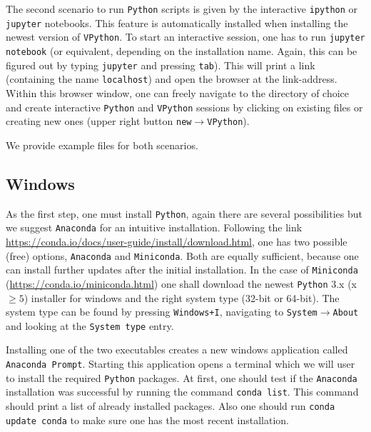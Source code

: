 \documentclass[12pt, UK english]{iopart}
\newcommand{\python}[0]{\texttt{Python}}
\newcommand{\vpython}[0]{\texttt{VPython}}
\newcommand{\code}[1]{{\scriptsize\colorbox{light-gray}{\texttt{#1}}}}
\begin{document}
The second scenario to run \python{} scripts is given by the interactive \texttt{ipython} or \texttt{jupyter} notebooks.
This feature is automatically installed when installing the newest version of \vpython{}.
To start an interactive session, one has to run \code{jupyter notebook} (or equivalent, depending on the installation name. Again, this can be figured out by typing \code{jupyter} and pressing \texttt{tab}).
This will print a link (containing the name \texttt{localhost}) and open the browser at the link-address.
Within this browser window, one can freely navigate to the directory of choice and create interactive \python{} and \vpython{} sessions by clicking on existing files or creating new ones (upper right button \texttt{new}$\rightarrow$\vpython{}).

We provide example files for both scenarios.

\subsection{Windows}\label{appendix:python-windows}

As the first step, one must install \python{}, again there are several possibilities but we suggest \texttt{Anaconda} for an intuitive installation.
Following the link \url{https://conda.io/docs/user-guide/install/download.html}, one has two possible (free) options, \texttt{Anaconda} and \texttt{Miniconda}.
Both are equally sufficient, because one can install further updates after the initial installation.
In the case of \texttt{Miniconda} (\url{https://conda.io/miniconda.html}) one shall download the newest \python{} 3.x (x $\geq5$) installer for windows and the right system type (32-bit or 64-bit).
The system type can be found by pressing \texttt{Windows+I}, navigating to \texttt{System}$\rightarrow$\texttt{About} and looking at the \texttt{System type} entry.

Installing one of the two executables creates a new windows application called \texttt{Anaconda Prompt}.
Starting this application opens a terminal which we will user to install the required \python{} packages.
At first, one should test if the \texttt{Anaconda} installation was successful by running the command \code{conda list}.
This command should print a list of already installed packages.
Also one should run \code{conda update conda} to make sure one has the most recent installation.
\end{document}

